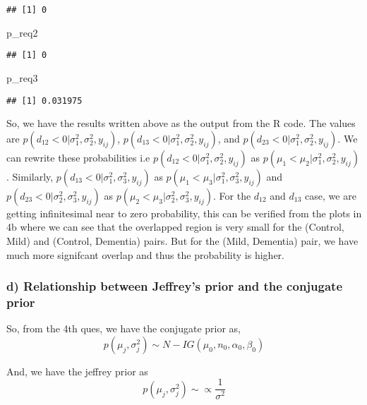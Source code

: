 \documentclass[]{article}
\newenvironment{Shaded}{\begin{snugshade}}{\end{snugshade}}
\newcommand{\NormalTok}[1]{{#1}}
\begin{document}
\begin{verbatim}
## [1] 0
\end{verbatim}

\begin{Shaded}
\begin{Highlighting}[]
\NormalTok{p_req2}
\end{Highlighting}
\end{Shaded}

\begin{verbatim}
## [1] 0
\end{verbatim}

\begin{Shaded}
\begin{Highlighting}[]
\NormalTok{p_req3}
\end{Highlighting}
\end{Shaded}

\begin{verbatim}
## [1] 0.031975
\end{verbatim}

So, we have the results written above as the output from the R code. The
values are \(p(d_{12} < 0| \sigma_1^2, \sigma_2^2, y_{ij})\),
\(p(d_{13} < 0| \sigma_1^2, \sigma_2^2, y_{ij})\), and
\(p(d_{23} < 0| \sigma_1^2, \sigma_2^2, y_{ij})\). We can rewrite these
probabilities i.e \(p(d_{12} < 0| \sigma_1^2, \sigma_2^2, y_{ij})\) as
\(p(\mu_1 < \mu_2| \sigma_1^2, \sigma_2^2, y_{ij})\). Similarly,
\(p(d_{13} < 0| \sigma_1^2, \sigma_3^2, y_{ij})\) as
\(p(\mu_1 < \mu_3| \sigma_1^2, \sigma_3^2, y_{ij})\) and
\(p(d_{23} < 0| \sigma_2^2, \sigma_3^2, y_{ij})\) as
\(p(\mu_2 < \mu_3| \sigma_2^2, \sigma_3^2, y_{ij})\). For the \(d_{12}\)
and \(d_{13}\) case, we are getting infinitesimal near to zero
probability, this can be verified from the plots in 4b where we can see
that the overlapped region is very small for the (Control, Mild) and
(Control, Dementia) pairs. But for the (Mild, Dementia) pair, we have
much more signifcant overlap and thus the probability is higher.

\subsubsection{d) Relationship between Jeffrey's prior and the conjugate
prior}\label{d-relationship-between-jeffreys-prior-and-the-conjugate-prior}

So, from the 4th ques, we have the conjugate prior as,
\[p(\mu_j, \sigma_j^2) \sim N-IG(\mu_0, n_0, \alpha_0, \beta_0)\]

And, we have the jeffrey prior as
\[p(\mu_j, \sigma_j^2) \sim \propto \frac{1}{\sigma^2}\]
\end{document}
